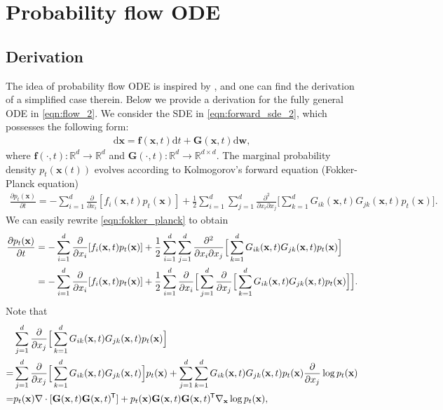 \documentclass{article} %
\newcommand*{\tran}{^{\mkern-1.5mu\mathsf{T}}}
\newcommand{\mbf}[1]{\mathbf{#1}}
\newcommand{\mbb}[1]{\mathbb{#1}}
\newcommand{\ud}{\mathrm{d}}
\newcommand{\bfx}{\mathbf{x}}
\newcommand{\bfw}{\mathbf{w}}
\newcommand{\bff}{\mathbf{f}}
\newcommand{\bfG}{\mathbf{G}}
\begin{document}
\section{Probability flow ODE}\label{app:prob_flow_ode}
\subsection{Derivation}\label{app:prob_flow_derive}
The idea of probability flow ODE is inspired by \citet{maoutsa2020interacting}, and one can find the derivation of a simplified case therein. Below we provide a derivation for the fully general ODE in \cref{eqn:flow_2}. We consider the SDE in \cref{eqn:forward_sde_2}, which possesses the following form:
\begin{align*}
    \ud \bfx = \bff(\bfx, t) \ud t + \mbf{G}(\bfx, t) \ud \bfw,
\end{align*}
where $\bff(\cdot, t): \mbb{R}^d \to \mbb{R}^d$ and $\mbf{G}(\cdot, t): \mbb{R}^d \to \mbb{R}^{d\times d}$. The marginal probability density $p_t(\mbf{x}(t))$ evolves according to Kolmogorov's forward equation (Fokker-Planck equation)~\citep{oksendal2003stochastic}
\begin{align}
    \frac{\partial p_t(\bfx)}{\partial t} = -\sum_{i=1}^d \frac{\partial}{\partial x_i}[f_i(\bfx, t) p_t(\bfx)] + \frac{1}{2}\sum_{i=1}^d\sum_{j=1}^d \frac{\partial^2}{\partial x_i \partial x_j}\Big[\sum_{k=1}^d G_{ik}(\bfx, t) G_{jk}(\bfx, t) p_t(\bfx)\Big] \label{eqn:fokker_planck}.
\end{align}
We can easily rewrite \cref{eqn:fokker_planck} to obtain
\begin{align}
    \frac{\partial p_t(\bfx)}{\partial t} &= -\sum_{i=1}^d \frac{\partial}{\partial x_i}[f_i(\bfx, t) p_t(\bfx)] + \frac{1}{2}\sum_{i=1}^d\sum_{j=1}^d \frac{\partial^2}{\partial x_i \partial x_j}\Big[\sum_{k=1}^d G_{ik}(\bfx, t) G_{jk}(\bfx, t) p_t(\bfx)\Big]\notag \\
    &= -\sum_{i=1}^d \frac{\partial}{\partial x_i}[f_i(\bfx, t) p_t(\bfx)] + \frac{1}{2}\sum_{i=1}^d \frac{\partial}{\partial x_i} \Big[ \sum_{j=1}^d \frac{\partial}{\partial x_j}\Big[\sum_{k=1}^d G_{ik}(\bfx, t) G_{jk}(\bfx, t) p_t(\bfx)\Big]\Big]. \label{eqn:ode_part_1}
\end{align}
Note that
\begin{align*}
    &\sum_{j=1}^d \frac{\partial}{\partial x_j}\Big[\sum_{k=1}^d G_{ik}(\bfx, t) G_{jk}(\bfx, t) p_t(\bfx)\Big]\\
    =& \sum_{j=1}^d \frac{\partial}{\partial x_j} \Big[ \sum_{k=1}^d G_{ik}(\bfx, t) G_{jk}(\bfx, t) \Big] p_t(\bfx) + \sum_{j=1}^d \sum_{k=1}^d G_{ik}(\bfx, t)G_{jk}(\bfx, t) p_t(\bfx) \frac{\partial}{\partial x_j} \log p_t(\bfx)\\
    =& p_t(\bfx) \nabla \cdot [\bfG(\bfx, t)\bfG(\bfx, t)\tran] + p_t(\bfx) \bfG(\bfx, t)\bfG(\bfx, t)\tran \nabla_\bfx \log p_t(\bfx),
\end{align*}
\end{document}
